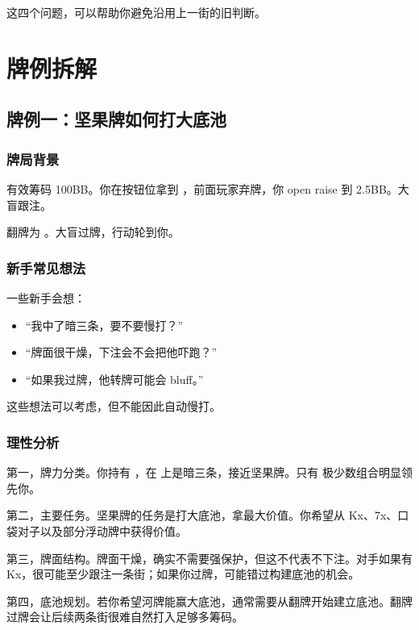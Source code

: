 这四个问题，可以帮助你避免沿用上一街的旧判断。

\section{牌例拆解}

\subsection{牌例一：坚果牌如何打大底池}

\subsubsection*{牌局背景}

有效筹码 100BB。你在按钮位拿到 ，前面玩家弃牌，你 open raise 到 2.5BB。大盲跟注。

翻牌为 。大盲过牌，行动轮到你。

\subsubsection*{新手常见想法}

一些新手会想：

\begin{itemize}
\item “我中了暗三条，要不要慢打？”
\item “牌面很干燥，下注会不会把他吓跑？”
\item “如果我过牌，他转牌可能会 bluff。”
\end{itemize}

这些想法可以考虑，但不能因此自动慢打。

\subsubsection*{理性分析}

第一，牌力分类。你持有 ，在  上是暗三条，接近坚果牌。只有  极少数组合明显领先你。

第二，主要任务。坚果牌的任务是打大底池，拿最大价值。你希望从 Kx、7x、口袋对子以及部分浮动牌中获得价值。

第三，牌面结构。牌面干燥，确实不需要强保护，但这不代表不下注。对手如果有 Kx，很可能至少跟注一条街；如果你过牌，可能错过构建底池的机会。

第四，底池规划。若你希望河牌能赢大底池，通常需要从翻牌开始建立底池。翻牌过牌会让后续两条街很难自然打入足够多筹码。

